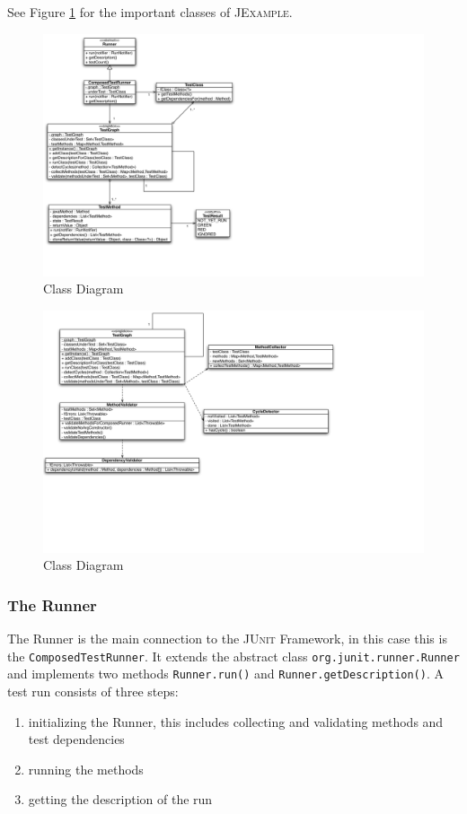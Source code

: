 \documentclass[11pt]{article}
\newcommand{\JUnit}{\textsc{JUnit}\xspace}
\newcommand{\JExample}{\textsc{JExample}\xspace}
\begin{document}
See Figure \ref{fig:classDiag} for the important classes of \JExample.

\begin{figure}[htbp]
 \includegraphics[width=24.0cm]{classdiagram.pdf}
 \caption{Class Diagram}
 \label{fig:classDiag}
\end{figure}


\begin{figure}[htbp]
 \includegraphics[width=20.0cm]{classdiagramInit.pdf}
 \caption{Class Diagram}
 \label{fig:classDiagInit}
\end{figure}


\subsubsection{The Runner}

The Runner is the main connection to the \JUnit Framework, in this case this is the \verb|ComposedTestRunner|. It extends the abstract class \verb|org.junit.runner.Runner| and implements two methods \verb|Runner.run()| and \verb|Runner.getDescription()|. A test run consists of three steps:
\begin{enumerate}
 \item initializing the Runner, this includes collecting and validating methods and test dependencies
 \item running the methods
 \item getting the description of the run
\end{enumerate}
\end{document}
